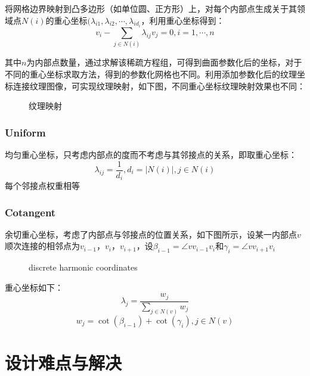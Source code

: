 \documentclass[14pt]{scrartcl} %
\begin{document}
	将网格边界映射到凸多边形（如单位圆、正方形）上，对每个内部点生成关于其领域点$N(i)$的重心坐标$(\lambda_{i1},\lambda_{i2},\cdots,\lambda_{id_i}$，利用重心坐标得到：
	\begin{equation}
		v_i-\sum\limits_{j\in N(i)}\lambda_{ij}v_j=0,i=1,\cdots,n
	\end{equation}
	
	其中$n$为内部点数量，通过求解该稀疏方程组，可得到曲面参数化后的坐标，对于不同的重心坐标求取方法，得到的参数化网格也不同。利用添加参数化后的纹理坐标连接纹理图像，可实现纹理映射，如下图，不同重心坐标纹理映射效果也不同：
	\begin{figure}[h] %
		\centering
		\caption{纹理映射}
	\end{figure}
	
	\subsubsection{Uniform}
	均匀重心坐标，只考虑内部点的度而不考虑与其邻接点的关系，即取重心坐标：
	\begin{equation}
		\lambda_{ij}=\frac{1}{d_i},d_i=|N(i)|,j\in N(i)
	\end{equation}
	每个邻接点权重相等
	
	\subsubsection{Cotangent}
	余切重心坐标，考虑了内部点与邻接点的位置关系，如下图所示，设某一内部点$v$顺次连接的相邻点为$v_{i-1}$，$v_i$，$v_{i+1}$，设$\beta_{i-1}=\angle{vv_{i-1}v_i}$和$\gamma_i=\angle{vv_{i+1}v_i}$
	\begin{figure}[h] %
		\centering
		\caption{discrete harmonic coordinates}
	\end{figure}
	
	重心坐标如下：
	\begin{equation}
		\lambda_j=\frac{w_j}{\sum\limits_{j\in N(v)}w_j}
	\end{equation}
	\begin{equation}
		w_j=\cot(\beta_{i-1})+\cot(\gamma_i),j\in N(v)
	\end{equation}
	
	
	\pagebreak
	\section{设计难点与解决}
	
\end{document}
